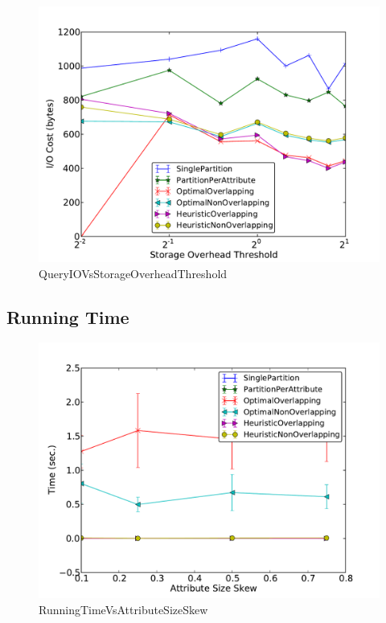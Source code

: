  \begin{figure}[ht]
 \centerline{\includegraphics[width=0.9\columnwidth]{figures/QueryIOVsStorageOverheadThreshold.pdf}}
 \caption{QueryIOVsStorageOverheadThreshold}
 \end{figure}


\subsection{Running Time}

\begin{figure}[ht]
\centerline{\includegraphics[width=0.9\columnwidth]{figures/RunningTimeVsAttributeSizeSkew.pdf}}
\caption{RunningTimeVsAttributeSizeSkew}
\end{figure}

